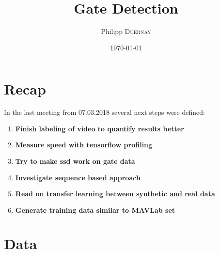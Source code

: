 \documentclass{article}
\title{Gate Detection} %
\author{Philipp \textsc{Duernay}} %
\date{\today} %
\begin{document}
\maketitle


\section{Recap}
In the last meeting from 07.03.2018 several next steps were defined:
\begin{enumerate}
	\item \textbf{Finish labeling of video to quantify results better}
	\item \textbf{Measure speed with tensorflow profiling}
	\item \textbf{Try to make ssd work on gate data}
	\item \textbf{Investigate sequence based approach}
	\item \textbf{Read on transfer learning between synthetic and real data}
	\item \textbf{Generate training data similar to MAVLab set}
\end{enumerate}

\section{Data}
\end{document}
